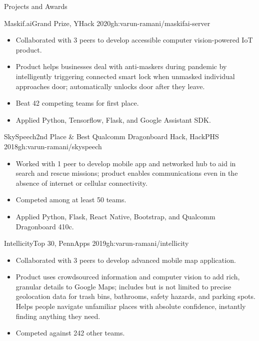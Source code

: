 \documentclass[]{mcdowellcv}
\begin{document}
	\begin{cvsection}{Projects and Awards}
		\begin{cvsubsection}{Maskif.ai}{Grand Prize, YHack 2020}{gh:varun-ramani/maskifai-server}
			\begin{itemize}
				\item Collaborated with 3 peers to develop accessible computer vision-powered IoT product.
				\item Product helps businesses deal with anti-maskers during pandemic by intelligently 
				triggering connected smart lock when unmasked individual approaches door; 
				automatically unlocks door after they leave.
				\item Beat 42 competing teams for first place.
				\item Applied Python, Tensorflow, Flask, and Google Assistant SDK. 
			\end{itemize}
		\end{cvsubsection}
		\begin{cvsubsection}{SkySpeech}{2nd Place \& Best Qualcomm Dragonboard Hack, HackPHS 2018}{gh:varun-ramani/skyspeech}
			\vspace{0.8em}
			\begin{itemize}
				\item Worked with 1 peer to develop mobile app and networked hub to aid in search and rescue missions; 
				product enables communications even in the absence of internet or cellular connectivity.
				\item Competed among at least 50 teams.
				\item Applied Python, Flask, React Native, Bootstrap, and Qualcomm Dragonboard 410c.
			\end{itemize}
		\end{cvsubsection}
		\begin{cvsubsection}{Intellicity}{Top 30, PennApps 2019}{gh:varun-ramani/intellicity}
			\begin{itemize}
				\item Collaborated with 3 peers to develop advanced mobile map application.
				\item Product uses crowdsourced information and computer vision to add rich, granular details
				to Google Maps; includes but is not limited to precise geolocation data for trash bins, bathrooms, 
				safety hazards, and parking spots. Helps people navigate unfamiliar
				places with absolute confidence, instantly finding anything they need. 
				\item Competed against 242 other teams.

\end{itemize}
\end{cvsubsection}
\end{cvsection}
\end{document}
